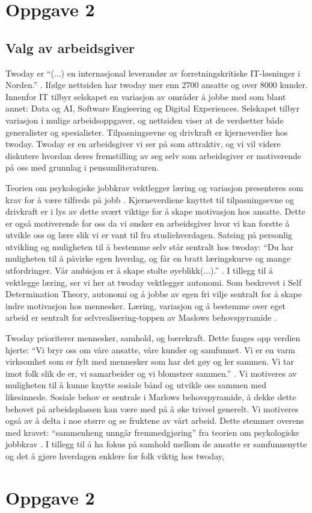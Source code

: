 \section{Oppgave 2}
\subsection{Valg av arbeidsgiver}
Twoday er \enquote{(...) en internasjonal leverandør av forretningskritiske IT-løsninger i Norden.}
\cite{twoday.no}. Ifølge nettsiden har twoday mer enn 2700 ansatte og over 8000 kunder. Innenfor IT
tilbyr selskapet en variasjon av områder å jobbe med som blant annet: Data og AI, Software Engieering
og Digital Experiences. Selskapet tilbyr variasjon i mulige arbeidsoppgaver, og nettsiden viser at de
verdsetter både generalister og spesialister. Tilpasningsevne og drivkraft er kjerneverdier hos twoday. Twoday er
en arbeidsgiver vi ser på som attraktiv, og vi vil videre diskutere hvordan deres fremstilling av seg selv som 
arbeidsgiver er motiverende på oss med grunnlag i pensumliteraturen. 

Teorien om psykologiske jobbkrav vektlegger læring og variasjon presenteres som krav for å være tilfreds på jobb \parencite[][s.120]{Teknologiledelse}. 
Kjerneverdiene knyttet til tilpasningsevne og drivkraft er i lys av dette svært viktige for å skape motivasjon hos ansatte. Dette er også motiverende for 
oss da vi ønsker en arbeidsgiver hvor vi kan forstte å utvikle oss og lære slik vi er vant til fra studiehverdagen.
Satsing på personlig utvikling og muligheten til å bestemme selv står sentralt hos twoday: \enquote{Du har muligheten
til å påvirke egen hverdag, og får en bratt læringskurve og mange utfordringer. Vår ambisjon er å
skape stolte øyeblikk(...).} \parencite["Graduateprogrammet"]{twoday.no}. I tillegg til å vektlegge læring, ser
vi her at twoday vektlegger autonomi. Som beskrevet i Self Determination Theory\parencite[][s.121]{Teknologiledelse},
autonomi og å jobbe av egen fri vilje sentralt for å skape indre motivasjon hos mennesker. Læring,
variasjon og å bestemme over eget arbeid er sentralt for selvrealisering-toppen av Maslows
behovspyramide \parencite[][s.116]{Teknologiledelse}.

Twoday prioriterer mennesker, samhold, og bærekraft. Dette fanges opp verdien hjerte:
“Vi bryr oss om våre ansatte, våre kunder og samfunnet. Vi er en varm virksomhet som er fylt
med mennesker som har det gøy og ler sammen. Vi tar imot folk slik de er, vi samarbeider og vi
blomstrer sammen.” \parencite["Om oss"]{twoday.no}. Vi motiveres av muligheten til å kunne knytte sosiale bånd
og utvikle oss sammen med likesinnede. Sosiale behov er sentrale i Marlows behovspyramide, å dekke
dette behovet på arbeidsplassen kan være med på å øke trivsel generelt. Vi motiveres også av å delta
i noe større og se fruktene av vårt arbeid. Dette stemmer overens med kravet: “sammenheng unngår
fremmedgjøring” fra teorien om psykologiske jobbkrav \parencite[][s.120]{Teknologiledelse}. I tillegg til å ha fokus på samhold
mellom de ansatte er samfunnsnytte og det å gjøre hverdagen enklere for folk viktig hos
twoday, \section{Oppgave 2}
